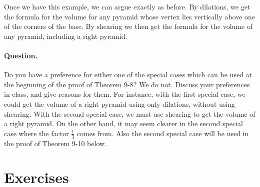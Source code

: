 \documentclass[12pt]{book} %
\begin{document}
Once we have this example, we can argue exactly as before. By dilations, we get the formula for the volume for any pyramid whose vertex lies vertically above one of the corners of the base. By shearing we then get the formula for the volume of any pyramid, including a right pyramid.

\paragraph{Question.}
Do you have a preference for either one of the special cases which can be used at the beginning of the proof of Theorem 9-8? We do not. Discuss your preferences in class, and give reasons for them. For instance, with the first special case, we could get the volume of a right pyramid using only dilations, without using shearing. With the second special case, we must use shearing to get the volume of a right pyramid. On the other hand, it may seem clearer in the second special case where the factor $\frac13$ comes from. Also the second special case will be used in the proof of Theorem 9-10 below.

\section*{Exercises}
\end{document}
